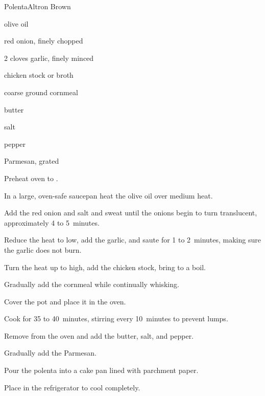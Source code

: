 \begin{recipe}{Polenta}{Altron Brown}{}

\begin{ingredients}
\item {} olive oil
\item \C{\threequarter} red onion, finely chopped
\item 2 cloves garlic, finely minced 
\item {} chicken stock or broth 
\item {} coarse ground cornmeal 
\item {} butter 
\item \tp{1\half} salt 
\item \tp{\quarter} pepper 
\item \C{\third} Parmesan, grated
\end{ingredients}

\begin{directions}
\item Preheat oven to . 
\item In a large, oven-safe saucepan heat the olive oil over medium heat.
\item Add the red onion and salt and sweat until the onions begin to turn translucent, approximately 4 to 5~minutes.
\item Reduce the heat to low, add the garlic, and saute for 1 to 2~minutes, making sure the garlic does not burn.
\item Turn the heat up to high, add the chicken stock, bring to a boil.
\item Gradually add the cornmeal while continually whisking.
\item Cover the pot and place it in the oven.
\item Cook for 35 to 40~minutes, stirring every 10~minutes to prevent lumps.
\item Remove from the oven and add the butter, salt, and pepper.
\item Gradually add the Parmesan. 
\item Pour the polenta into a cake pan lined with parchment paper.
\item Place in the refrigerator to cool completely. 
\end{directions}
\end{recipe}
